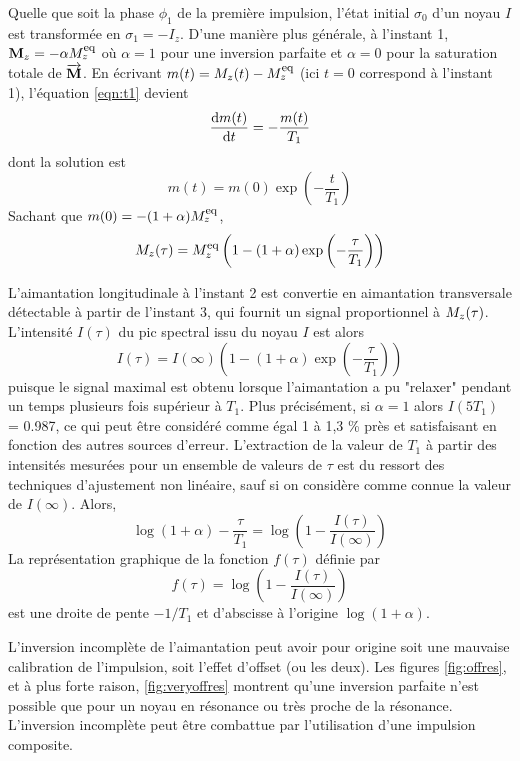 Quelle que soit la phase $\phi_1$ de la première impulsion, 
l'état initial $\sigma_0$ d'un noyau $I$ est transformée en $\sigma_1 = -I_z$.
D'une manière plus générale, à l'instant 1, $\mathbf{M}_z = -\alpha M^{\mbox{\footnotesize{eq}}}_z$ où
$\alpha = 1$ pour une inversion parfaite et $\alpha = 0$ 
pour la saturation totale de $\overrightarrow{\mathbf{M}}$.
En écrivant $m(t) = M_z(t) - M^{\mbox{\footnotesize{eq}}}_z$ (ici $t=0$ correspond à l'instant 1),
l'équation \ref{eqn:t1} devient
\begin{equation}
\frac{\mbox{d} m(t)}{\mbox{d} t} = -\frac{m(t)}{T_1}
\end{equation}
dont la solution est
\begin{equation}
m(t) = m(0) \exp\left(-\frac{t}{T_1}\right)
\end{equation}
Sachant que $m(0) = -(1+\alpha)M^{\mbox{\footnotesize{eq}}}_z$,
\begin{equation}
M_z(\tau) = M^{\mbox{\footnotesize{eq}}}_z\left(1-(1+\alpha)\exp\left(-\frac{\tau}{T_1}\right)\right)
\end{equation}

L'aimantation longitudinale à l'instant 2 est convertie
en aimantation transversale détectable à partir de l'instant 3, qui fournit un signal
proportionnel à $M_z(\tau)$.
L'intensité $I(\tau)$ du pic spectral issu du noyau $I$ est alors
\begin{equation}
\label{eqn:loit1}
I(\tau) = I(\infty)\left(1-(1+\alpha)\exp\left(-\frac{\tau}{T_1}\right)\right)
\end{equation}
puisque le signal maximal est obtenu lorsque l'aimantation a pu "relaxer"
pendant un temps plusieurs fois supérieur à $T_1$.
Plus précisément, si $\alpha = 1$ alors $I(5T_1)$ = 0.987, ce qui peut être considéré
comme égal 1 à 1,3 \% près et satisfaisant en fonction des autres sources d'erreur.
L'extraction de la valeur de $T_1$ à partir des intensités mesurées pour un ensemble
de valeurs de $\tau$ est du ressort des techniques d'ajustement non linéaire,
sauf si on considère comme connue la valeur de $I(\infty)$. Alors,
\begin{equation}
\log(1+\alpha) - \frac{\tau}{T_1} = \log\left(1-\frac{I(\tau)}{I(\infty)}\right)
\end{equation}
La représentation graphique de la fonction $f(\tau)$ définie par
\begin{equation}
f(\tau) = \log\left(1-\frac{I(\tau)}{I(\infty)}\right)
\end{equation}
est une droite de pente $-1/T_1$ et d'abscisse à l'origine $\log(1+\alpha)$.

L'inversion incomplète de l'aimantation peut avoir pour origine
soit une mauvaise calibration de l'impulsion, soit l'effet d'offset (ou les deux).
Les figures \ref{fig:offres}, et à plus forte raison, \ref{fig:veryoffres}
montrent qu'une inversion parfaite n'est possible que pour un noyau
en résonance ou très proche de la résonance.
L'inversion incomplète peut être combattue par l'utilisation
d'une impulsion composite.

